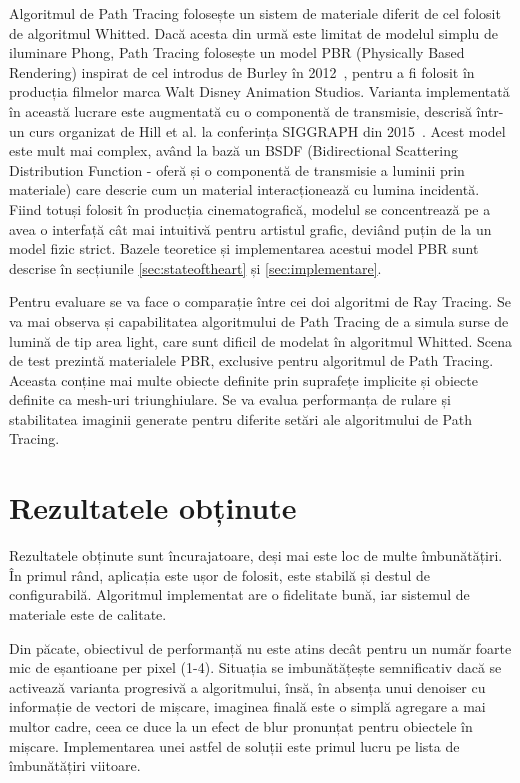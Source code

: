 \documentclass[12pt,a4paper]{report}
\numberwithin{equation}{section} %
\begin{document}
Algoritmul de Path Tracing folosește un sistem de materiale diferit de cel folosit
de algoritmul Whitted. Dacă acesta din urmă este limitat de modelul simplu de iluminare
Phong, Path Tracing folosește un model PBR (Physically Based Rendering) inspirat de
cel introdus de Burley în 2012~\cite{Disney}, pentru a fi folosit în producția filmelor
marca Walt Disney Animation Studios. Varianta implementată în această lucrare este
augmentată cu o componentă de transmisie, descrisă într-un curs organizat de Hill et al. la conferința SIGGRAPH din 2015~\cite{DisneyBSDF}.
Acest model este mult mai complex,
având la bază un BSDF (Bidirectional Scattering Distribution Function - oferă și
o componentă de transmisie a luminii prin materiale) care descrie cum un material
interacționează cu lumina incidentă. Fiind totuși folosit în producția cinematografică,
modelul se concentrează pe a avea o interfață cât mai intuitivă pentru artistul
grafic, deviând puțin de la un model fizic strict. Bazele teoretice și implementarea acestui model
PBR sunt descrise în secțiunile \ref{sec:stateoftheart} și \ref{sec:implementare}.

Pentru evaluare se va
face o comparație între cei doi algoritmi de Ray Tracing. Se va mai observa și
capabilitatea algoritmului de Path Tracing de a simula surse de lumină de tip
area light, care sunt dificil de modelat în algoritmul Whitted.
Scena de test prezintă materialele PBR, exclusive pentru algoritmul de Path Tracing.
Aceasta conține mai multe obiecte definite prin suprafețe implicite și obiecte
definite ca mesh-uri triunghiulare. Se va evalua performanța de rulare și
stabilitatea imaginii generate pentru diferite setări ale algoritmului de Path Tracing.

\section{Rezultatele obținute}

Rezultatele obținute sunt încurajatoare, deși mai este loc de multe îmbunătățiri.
În primul rând, aplicația este ușor de folosit, este stabilă și destul de configurabilă.
Algoritmul implementat are o fidelitate bună, iar sistemul de materiale este de calitate.

Din păcate, obiectivul de performanță nu este atins decât pentru un număr foarte
mic de eșantioane per pixel (1-4). Situația se imbunătățește semnificativ dacă
se activează varianta progresivă a algoritmului, însă, în absența unui denoiser
cu informație de vectori de mișcare, imaginea finală este o simplă agregare a
mai multor cadre, ceea ce duce la un efect de blur pronunțat pentru obiectele în mișcare.
Implementarea unei astfel de soluții este primul lucru pe lista de îmbunătățiri
viitoare.
\end{document}

